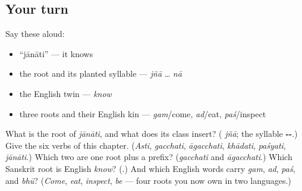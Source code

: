 \subsection*{Your turn}
Say these aloud:

\begin{itemize}
\raggedright
  \item \textquotedblleft{}jānāti\textquotedblright{} — it knows
  \item the root and its planted syllable — \emph{jñā} … \emph{nā}
  \item the English twin — \emph{know}
  \item three roots and their English kin — \emph{gam}/come, \emph{ad}/eat, \emph{paś}/inspect
\end{itemize}

\begin{tcolorbox}[breakable,colback=teal!4,colframe=teal!35!black,title={Before you move on}]
What is the root of \emph{jānāti}, and what does its class insert? (\textbf{} \emph{jñā}; the syllable \textbf{--}.) Give the six verbs of this chapter. (\emph{Asti}, \emph{gacchati}, \emph{āgacchati}, \emph{khādati}, \emph{paśyati}, \emph{jānāti}.) Which two are one root plus a prefix? (\emph{gacchati} and \emph{āgacchati}.) Which Sanskrit root is English \emph{know}? (\textbf{}.) And which English words carry \emph{gam}, \emph{ad}, \emph{paś}, and \emph{bhū}? (\emph{Come}, \emph{eat}, \emph{inspect}, \emph{be} — four roots you now own in two languages.)
\end{tcolorbox}
